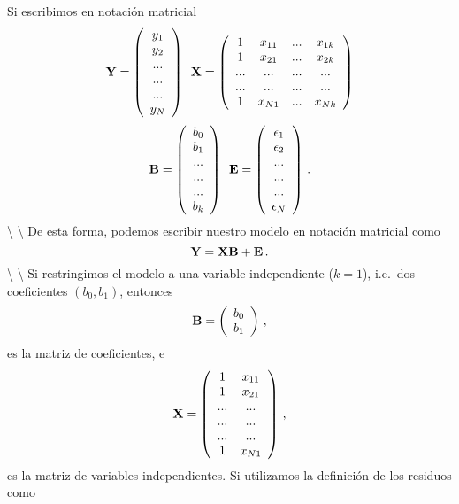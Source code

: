 \documentclass[
]{agujournal2019}
\begin{document}
\noindent Si escribimos en notación matricial
\[{\textbf Y}=\left(\begin{array}{c}
  y_1\\
  y_2\\
  ...\\
  ...\\
  ...\\
  y_N
  \end{array}\right)\,\,\,{\textbf X}=\left(\begin{array}{cccc}
  1 & x_{11} & ... & x_{1k}\\
  1 & x_{21} & ... & x_{2k}\\
  ... & ... & ... & ...\\
  ... & ... & ... & ...\\
  1 & x_{N1} & ... & x_{Nk}\\
      \end{array}\right)\] \[{\textbf B}=\left(\begin{array}{c}
  b_0\\
  b_1\\
  ...\\
  ...\\
  ...\\
  b_k
      \end{array}\right)\,\,\,{\textbf E}=\left(\begin{array}{c}
  \epsilon_1\\
  \epsilon_2\\
  ...\\
  ...\\
  ...\\
  \epsilon_N
      \end{array}\right)\,.\] \textbackslash{} \textbackslash{}
\noindent De esta forma, podemos escribir nuestro modelo en notación
matricial como \[{\textbf Y}={\textbf X}{\textbf B} + {\textbf E}\,.\]
\textbackslash{} \textbackslash{} \noindent Si restringimos el modelo a
una variable independiente (\(k=1\)), i.e.~dos coeficientes
\((b_0, b_1)\), entonces \[{\textbf B}=\left(\begin{array}{c}
  b_0\\
  b_1\\
      \end{array}\right)\,,\] es la matriz de coeficientes, e
\[{\textbf X}=\left(\begin{array}{cc}
  1& x_{11}\\
  1& x_{21}\\
  ... & ...\\
  ... & ...\\
   ... & ...\\
 1 & x_{N1}
 \end{array}\right)\,,\] es la matriz de variables independientes. Si
utilizamos la definición de los residuos como
\end{document}
